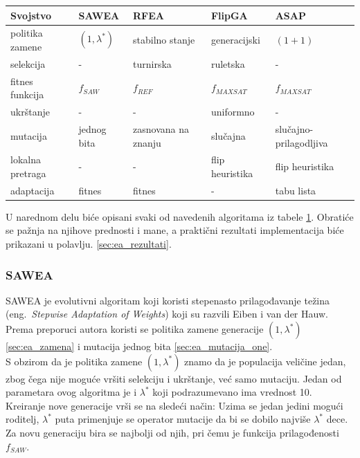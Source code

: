 \documentclass[a4paper]{article}
\begin{document}
\begin{table}[h!]
\centering
{}\label{tab:EA} 
\begin{tabular}{ |p{2.8cm}|p{2.3cm}|p{2.3cm}|p{2.3cm}|p{2.3cm}|}
 \hline
 Svojstvo & SAWEA & RFEA & FlipGA & ASAP \\
 \hline
 politika zamene & $(1, \lambda^*)$ & stabilno stanje & generacijski & $(1 + 1)$ \\
 selekcija & - & turnirska & ruletska & - \\
 fitnes funkcija &	$f_{SAW}$ & $f_{REF}$ & $f_{MAXSAT}$ & $f_{MAXSAT}$ \\
 ukrštanje & - & - & uniformno & - \\
 mutacija & jednog bita & zasnovana na znanju & slučajna & slučajno-prilagodljiva \\
 lokalna pretraga & - & - & flip heuristika & flip heuristika \\
 adaptacija & fitnes & fitnes &  - & tabu lista \\
 \hline
\end{tabular}
\end{table}


U narednom delu biće opisani svaki od navedenih algoritama iz tabele \ref{tab:EA}.
Obratiće se pažnja na njihove prednosti i mane, a praktični rezultati implementacija
biće prikazani u polavlju. \ref{sec:ea_rezultati}.


\subsubsection{SAWEA}
\label{sec:ea_sawea}
SAWEA je evolutivni algoritam koji koristi stepenasto prilagođavanje težina 
(eng.~{\em Stepwise Adaptation of Weights}) \cite{ea_with_table, ea_without_table} 
koji su razvili Eiben i van der Hauw. 
Prema preporuci autora koristi se politika zamene generacije $(1,\lambda^*)$
 \ref{sec:ea_zamena} i mutacija jednog bita \ref{sec:ea_mutacija_one}. \\

S obzirom da je politika zamene $(1,\lambda^*)$ znamo da je populacija veličine jedan,
zbog čega nije moguće vršiti selekciju i ukrštanje, već samo mutaciju. 
Jedan od parametara ovog algoritma je i $\lambda^*$ koji podrazumevano ima vrednost 10.
Kreiranje nove generacije vrši se na sledeći način:
Uzima se jedan jedini mogući roditelj, $\lambda^*$ puta primenjuje se operator mutacije
da bi se dobilo najviše $\lambda^*$ dece. Za novu generaciju bira se najbolji od njih,
pri čemu je funkcija prilagođenosti $f_{SAW}$.\\
\end{document}
